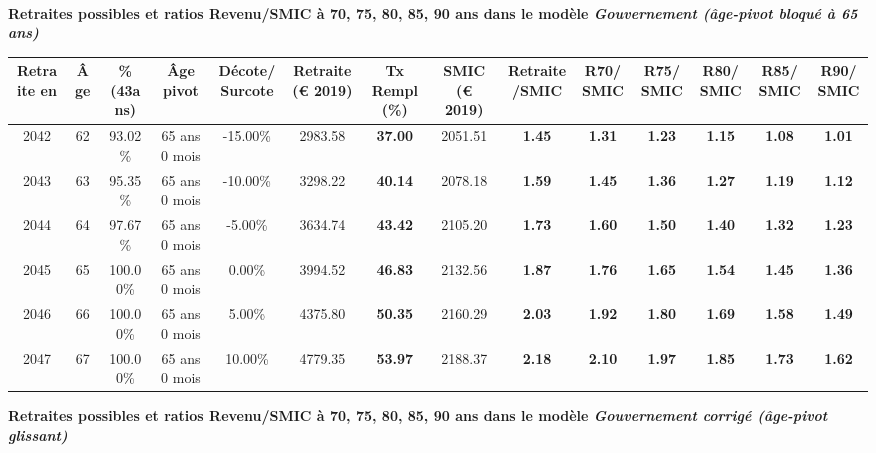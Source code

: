  ~\\{\bf \noindent Retraites possibles et ratios Revenu/SMIC à 70, 75, 80, 85, 90 ans dans le modèle \emph{Gouvernement (âge-pivot bloqué à 65 ans)}}  
 
\begin{adjustbox}{max width=\textwidth} 
\begin{tabular}[htb]{|c|c||c|c|c||c|c||c|c||c|c|c|c|c|} 
\hline 
 Retraite en &  Âge &  \%(43ans) &  Âge pivot &  Décote/Surcote &  Retraite (\euro{} 2019) &  Tx Rempl(\%) &  SMIC (\euro{} 2019) &  Retraite/SMIC &  R70/SMIC &  R75/SMIC &  R80/SMIC &  R85/SMIC &  R90/SMIC \\ 
\hline \hline 
 2042 &  62 &  93.02\% &  65 ans 0 mois &  -15.00\% &  2983.58 &  {\bf 37.00} &  2051.51 &  {\bf 1.45} &  {\bf 1.31} &  {\bf 1.23} &  {\bf 1.15} &  {\bf 1.08} &  {\bf 1.01} \\ 
\hline 
 2043 &  63 &  95.35\% &  65 ans 0 mois &  -10.00\% &  3298.22 &  {\bf 40.14} &  2078.18 &  {\bf 1.59} &  {\bf 1.45} &  {\bf 1.36} &  {\bf 1.27} &  {\bf 1.19} &  {\bf 1.12} \\ 
\hline 
 2044 &  64 &  97.67\% &  65 ans 0 mois &  -5.00\% &  3634.74 &  {\bf 43.42} &  2105.20 &  {\bf 1.73} &  {\bf 1.60} &  {\bf 1.50} &  {\bf 1.40} &  {\bf 1.32} &  {\bf 1.23} \\ 
\hline 
 2045 &  65 &  100.00\% &  65 ans 0 mois &  0.00\% &  3994.52 &  {\bf 46.83} &  2132.56 &  {\bf 1.87} &  {\bf 1.76} &  {\bf 1.65} &  {\bf 1.54} &  {\bf 1.45} &  {\bf 1.36} \\ 
\hline 
 2046 &  66 &  100.00\% &  65 ans 0 mois &  5.00\% &  4375.80 &  {\bf 50.35} &  2160.29 &  {\bf 2.03} &  {\bf 1.92} &  {\bf 1.80} &  {\bf 1.69} &  {\bf 1.58} &  {\bf 1.49} \\ 
\hline 
 2047 &  67 &  100.00\% &  65 ans 0 mois &  10.00\% &  4779.35 &  {\bf 53.97} &  2188.37 &  {\bf 2.18} &  {\bf 2.10} &  {\bf 1.97} &  {\bf 1.85} &  {\bf 1.73} &  {\bf 1.62} \\ 
\hline 
\hline 
\end{tabular} 
\end{adjustbox} 
 
 \vspace{0.1cm} 
{\bf \noindent Retraites possibles et ratios Revenu/SMIC à 70, 75, 80, 85, 90 ans dans le modèle \emph{Gouvernement corrigé (âge-pivot glissant)}}  
 
